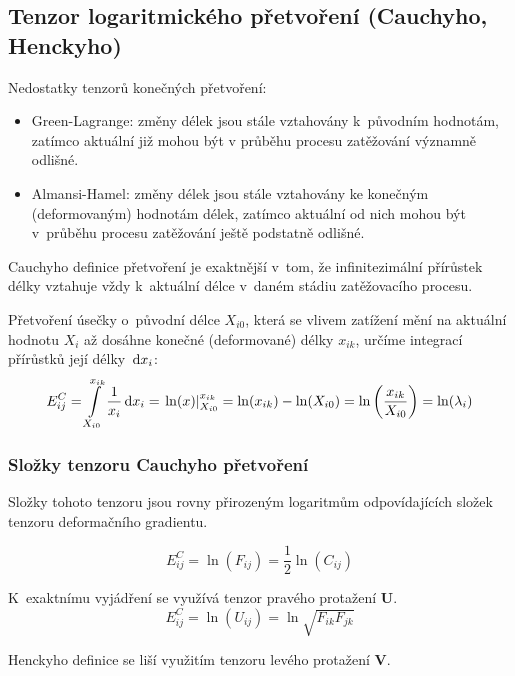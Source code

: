 
\subsection{Tenzor logaritmického přetvoření (Cauchyho, Henckyho)}
Nedostatky tenzorů konečných přetvoření:
\begin{itemize}
	\item Green-Lagrange: změny délek jsou stále vztahovány k~původním hodnotám, zatímco aktuální již mohou být v průběhu procesu zatěžování významně odlišné.
	\item Almansi-Hamel: změny délek jsou stále vztahovány ke konečným (deformovaným) hodnotám délek, zatímco aktuální od nich mohou být v~průběhu procesu zatěžování ještě podstatně odlišné.
\end{itemize}

Cauchyho definice přetvoření je exaktnější v~tom, že infinitezimální přírůstek délky vztahuje vždy k~aktuální délce v~daném stádiu zatěžovacího procesu.

Přetvoření úsečky o~původní délce $X_{i0}$, která se vlivem zatížení mění na aktuální hodnotu $X_i$ až dosáhne konečné (deformované) délky $x_{ik}$, určíme integrací přírůstků její délky $\,\mathrm{d} x_i$:
\begin{equation}
	E^C_{ij}
	= \int\limits_{X_{i0}}^{x_{ik}} \frac{1}{x_i} \,\mathrm{d} x_i
	= \left. \ln(x) \right\rvert_{X_{i0}}^{x_{ik}}
	= \ln(x_{ik}) - \ln(X_{i0})
	= \ln\left(\frac{x_{ik}}{X_{i0}}\right)
	= \ln(\lambda_i)
\end{equation}

\subsubsection{Složky tenzoru Cauchyho přetvoření}

Složky tohoto tenzoru jsou rovny přirozeným logaritmům odpovídajících složek tenzoru deformačního gradientu.

\begin{equation}
	E^C_{ij} = \ln(F_{ij}) = \frac{1}{2} \ln(C_{ij})
\end{equation}

K~exaktnímu vyjádření se využívá tenzor pravého protažení $\bm{U}$.
\begin{equation}
E^C_{ij} = \ln(U_{ij}) = \ln\sqrt{F_{ik} F_{jk}}
\end{equation}

Henckyho definice se liší využitím tenzoru levého protažení $\bm{V}$.